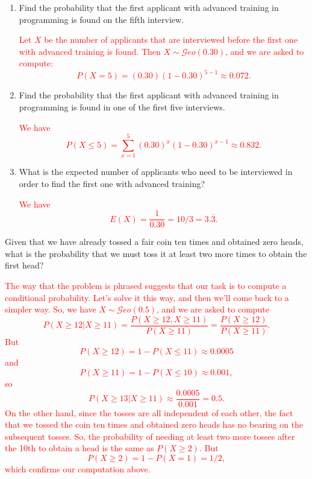 \documentclass[12pt,reqno]{amsart}
\begin{document}
\medskip
\begin{enumerate}
\item Find the probability that the first applicant with advanced training in programming is found on the fifth interview.

\bigskip
\textcolor{red}{Let $X$ be the number of applicants that are interviewed before the first one with advanced training is found. Then $X\sim \mathcal{G}eo(0.30)$, and we are asked to compute:
	\[P(X=5) = (0.30)(1-0.30)^{5-1} \approx 0.072.
	\]}
\bigskip

\item Find the probability that the first applicant with advanced training in programming is found in one of the first five interviews.

\bigskip
\textcolor{red}{We have
	\[P(X\leq 5) = \sum_{x=1}^5 (0.30)^x(1-0.30)^{x-1} \approx 0.832.
	\]}
\bigskip

\item What is the expected number of applicants who need to be interviewed in order to find the first one with advanced training?

\bigskip
\textcolor{red}{We have
	\[E(X) = \frac{1}{0.30} = 10/3 = 3.\bar{3}.
	\]}
\end{enumerate}













\bigskip
\prob Given that we have already tossed a fair coin ten times and obtained zero heads, what is the probability that we must toss it at least two more times to obtain the first head?

\bigskip
\textcolor{red}{The way that the problem is phrased suggests that our task is to compute a conditional probability. Let's solve it this way, and then we'll come back to a simpler way. So, we have $X\sim \mathcal{G}eo(0.5)$, and we are asked to compute
	\[P(X\geq 12 |X\geq 11) = \frac{P(X\geq 12, X\geq 11)}{P(X\geq 11)} = \frac{P(X\geq 12)}{P(X\geq 11)}.
	\]
But
	\[P(X\geq 12) = 1 - P(X\leq 11) \approx 0.0005 
	\]
and
	\[P(X\geq 11) = 1 - P(X\leq 10) \approx 0.001,
	\]
so
	\[P(X\geq 13 |X\geq 11) \approx \frac{0.0005}{0.001} = 0.5.
	\]
On the other hand, since the tosses are all independent of each other, the fact that we tossed the coin ten times and obtained zero heads has no bearing on the subsequent tosses. So, the probability of needing at least two more tosses after the 10th to obtain a head is the same as $P(X\geq 2)$. But
	\[P(X\geq 2) = 1 - P(X=1) = 1/2,
	\]
which confirms our computation above.}
\end{document}
